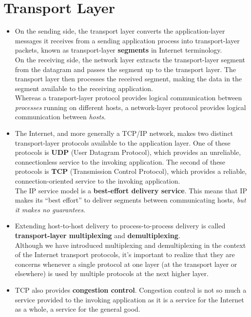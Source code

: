 \section{Transport Layer}
\begin{itemize}

\item
On the sending side, the transport layer converts the application-layer messages it receives from a sending application process into transport-layer packets, known as transport-layer \textbf{segments} in Internet terminology.\\
On the receiving side, the network layer extracts the transport-layer segment from the datagram and passes the segment up to the transport layer. The transport layer then processes the received segment, making the data in the segment available to the receiving application.\\
Whereas a transport-layer protocol provides logical communication between \textit{processes} running on different hosts, a network-layer protocol provides logical communication between \textit{hosts}.

\item
The Internet, and more generally a TCP/IP network, makes two distinct transport-layer protocols available to the application layer. One of these protocols is \textbf{UDP} (User Datagram Protocol), which provides an unreliable, connectionless service to the invoking application. The second of these protocols is \textbf{TCP} (Transmission Control Protocol), which provides a reliable, connection-oriented service to the invoking application.\\
The IP service model is a \textbf{best-effort delivery service}. This means that IP makes its ``best effort'' to deliver segments between communicating hosts, \textit{but it makes no guarantees}.

\item
Extending host-to-host delivery to process-to-process delivery is called \textbf{transport-layer multiplexing} and \textbf{demultiplexing}.\\
Although we have introduced multiplexing and demultiplexing in the context of the Internet transport protocols, it's important to realize that they are concerns whenever a single protocol at one layer (at the transport layer or elsewhere) is used by multiple protocols at the next higher layer.

\item
TCP also provides \textbf{congestion control}. Congestion control is not so much a service provided to the invoking application as it is a service for the Internet as a whole, a service for the general good.


\end{itemize}
